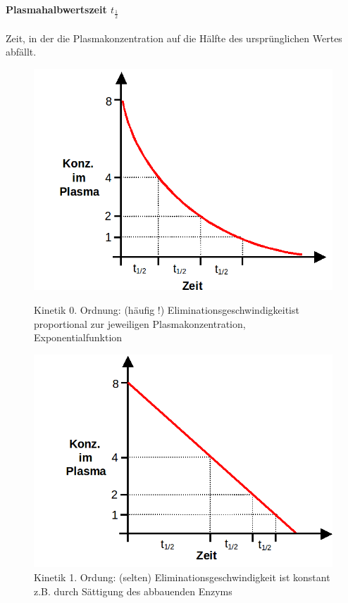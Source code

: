 \documentclass[10pt,a4paper]{report}
\begin{document}
\paragraph{Plasmahalbwertszeit $t_{\frac{1}{2}}$} Zeit, in der die Plasmakonzentration auf die Hälfte des ursprünglichen Wertes abfällt.
\begin{figure}[!htb]\centering
   \begin{minipage}{0.49\textwidth}
     \includegraphics[width=\linewidth]{kinetik0.png}
     \caption{Kinetik 0. Ordnung: (häufig !) Eliminationsgeschwindigkeitist proportional 	zur jeweiligen Plasmakonzentration, 
Exponentialfunktion}\label{Fig:kinetik0}
   \end{minipage}
   \begin {minipage}{0.49\textwidth}
     \includegraphics[width=\linewidth]{kinetik1.png}
     \caption{Kinetik 1. Ordung: (selten)
Eliminationsgeschwindigkeit ist konstant
z.B. durch Sättigung des abbauenden Enzyms}\label{Fig:kinetik1}
   \end{minipage}
\end{figure}
\end{document}
